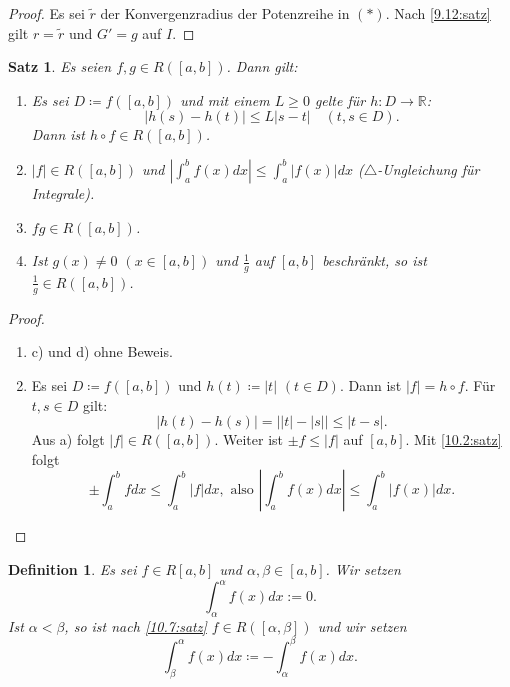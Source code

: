 \documentclass[12pt]{extreport} %
\newcommand{\R}{\mathbb{R}}
\theoremstyle{named}
\theoremstyle{itshape}
\newtheorem{satz}[unnamedtheorem]{Satz}
\newtheorem*{definition}{Definition}
\theoremstyle{normal}
\begin{document}
{\begin{proof}
	Es sei $\tilde{r}$ der Konvergenzradius der Potenzreihe in $(\ast)$. Nach \ref{9.12:satz} gilt $r = \tilde{r}$ und $G' = g$ auf $I$.	
\end{proof}


\begin{satz} \label{10.10:satz}
	Es seien $f, g \in R([a, b])$. Dann gilt:
	\begin{enumerate}
		\item Es sei $D \coloneqq f([a, b])$ und mit einem $L \geq 0$ gelte für $h \colon D \rightarrow \R$:
			$$ |h(s) - h(t)| \leq L |s - t| \quad (t, s \in D). $$
			Dann ist $h \circ f \in R([a, b])$.
		\item $|f| \in R([a, b])$ und $|\int_{a}^{b} f(x) dx| \leq \int_{a}^{b} |f(x)| dx$ ($\triangle$-Ungleichung für Integrale).
		\item $fg \in R([a, b])$.
		\item Ist $g(x) \neq 0$ $(x \in [a, b])$ und $\frac{1}{g}$ auf $[a, b]$ beschränkt, so ist $\frac{1}{g} \in R([a, b])$.
	\end{enumerate}
\end{satz}

\begin{proof} ~\
	\begin{enumerate}
		\item c) und d) ohne Beweis.
		\item Es sei $D \coloneqq f([a, b])$ und $h(t) \coloneqq |t|$ $(t \in D)$. Dann ist $|f| = h \circ f$. Für $t, s \in D$ gilt: 
			$$ |h(t) - h(s)| = \left| |t| - |s| \right| \le |t - s|. $$
			Aus a) folgt $|f| \in R([a, b])$. Weiter ist $\pm f \leq |f|$ auf $[a, b]$. Mit \ref{10.2:satz} folgt 
			$$ \pm \int_{a}^{b} f dx \leq \int_{a}^{b} |f| dx, \text { also }  |\int_{a}^{b} f(x) dx| \leq \int_{a}^{b} |f(x)| dx. $$
			
	\end{enumerate}
\end{proof}


\begin{definition}
	Es sei $f \in R[a, b]$ und $\alpha, \beta \in [a, b]$. Wir setzen
	$$\int_{\alpha}^{\alpha} f(x) dx := 0.$$ 
	Ist $\alpha < \beta$, so ist nach \ref{10.7:satz} $f \in R([\alpha, \beta])$ und wir setzen
	$$ \int_{\beta}^{\alpha} f(x) dx \coloneqq - \int_{\alpha}^{\beta} f(x) dx. $$
\end{definition}

}
\end{document}
